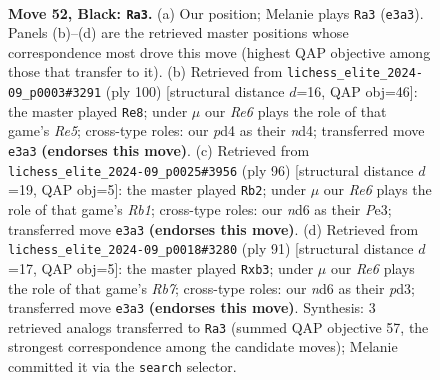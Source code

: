 \documentclass[11pt]{article}
\begin{document}
\clearpage

\begin{figure}[p]\centering
\begin{subfigure}{0.46\textwidth}\centering
\resizebox{\linewidth}{!}{%
\newchessgame
\chessboard[
  setfen={1R6/6pk/3N1p2/5p1p/3P3P/4r1P1/5K2/8 b - - 3 52},
  showmover=false,
  pgfstyle=straightmove, color=movearrow, markmove={e3-a3}
]}
\caption{}
\end{subfigure}\hfill
\begin{subfigure}{0.46\textwidth}\centering
\resizebox{\linewidth}{!}{%
\newchessgame
\chessboard[
  setfen={8/8/5k2/4Rp2/3np2p/7P/1r3PP1/6K1 w - - 2 51},
  showmover=false,
  pgfstyle=straightmove, color=movearrow, markmove={e5-e8}
]}
\caption{}
\end{subfigure}
\\[4pt]
\begin{subfigure}{0.46\textwidth}\centering
\resizebox{\linewidth}{!}{%
\newchessgame
\chessboard[
  setfen={7k/8/5p2/6pP/4p1P1/1pr1P3/5PK1/1R6 w - - 2 49},
  showmover=false,
  pgfstyle=straightmove, color=movearrow, markmove={b1-b2}
]}
\caption{}
\end{subfigure}\hfill
\begin{subfigure}{0.46\textwidth}\centering
\resizebox{\linewidth}{!}{%
\newchessgame
\chessboard[
  setfen={8/p7/1p4R1/2p4p/2P4k/1P1P4/1r6/7K b - - 0 46},
  showmover=false,
  pgfstyle=straightmove, color=movearrow, markmove={b2-b3}
]}
\caption{}
\end{subfigure}
\caption{\textbf{Move 52, Black: \texttt{Ra3}.} (a) Our position; Melanie plays \texttt{Ra3} (\texttt{e3a3}). Panels (b)--(d) are the retrieved master positions whose correspondence most drove this move (highest QAP objective among those that transfer to it). (b) Retrieved from \texttt{lichess\_elite\_2024-09\_p0003\#3291} (ply 100) [structural distance $d$=16, QAP obj=46]: the master played \texttt{Re8}; under $\mu$ our \emph{Re6} plays the role of that game's \emph{Re5}; cross-type roles: our \emph{p}d4 as their \emph{n}d4; transferred move \texttt{e3a3} \textbf{(endorses this move)}. (c) Retrieved from \texttt{lichess\_elite\_2024-09\_p0025\#3956} (ply 96) [structural distance $d$=19, QAP obj=5]: the master played \texttt{Rb2}; under $\mu$ our \emph{Re6} plays the role of that game's \emph{Rb1}; cross-type roles: our \emph{n}d6 as their \emph{P}e3; transferred move \texttt{e3a3} \textbf{(endorses this move)}. (d) Retrieved from \texttt{lichess\_elite\_2024-09\_p0018\#3280} (ply 91) [structural distance $d$=17, QAP obj=5]: the master played \texttt{Rxb3}; under $\mu$ our \emph{Re6} plays the role of that game's \emph{Rb7}; cross-type roles: our \emph{n}d6 as their \emph{p}d3; transferred move \texttt{e3a3} \textbf{(endorses this move)}. Synthesis: 3 retrieved analogs transferred to \texttt{Ra3} (summed QAP objective 57, the strongest correspondence among the candidate moves); Melanie committed it via the \texttt{search} selector.}
\label{fig:thought-m103}
\end{figure}
\end{document}

